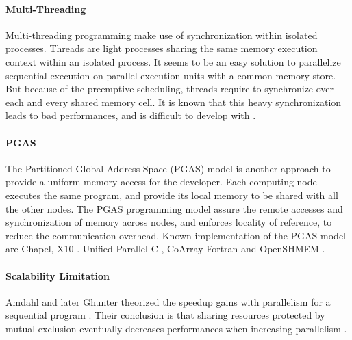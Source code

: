 
\paragraph{Multi-Threading}

Multi-threading programming make use of synchronization within isolated processes.
Threads are light processes sharing the same memory execution context within an isolated process.
It seems to be an easy solution to parallelize sequential execution on parallel execution units with a common memory store.
But because of the preemptive scheduling, threads require to synchronize over each and every shared memory cell.
It is known that this heavy synchronization leads to bad performances, and is difficult to develop with \cite{Adya2002}.


\paragraph{PGAS}

The Partitioned Global Address Space (PGAS) model is another approach to provide a uniform memory access for the developer.
Each computing node executes the same program, and provide its local memory to be shared with all the other nodes.
The PGAS programming model assure the remote accesses and synchronization of memory across nodes, and enforces locality of reference, to reduce the communication overhead.
Known implementation of the PGAS model are 
Chapel\cite{Chamberlain2007},
X10 \cite{Charles2005}.
Unified Parallel C \cite{El-Ghazawi2006},
CoArray Fortran \cite{Numrich1998} and
OpenSHMEM \cite{Chapman2010}.

\paragraph{Scalability Limitation}

Amdahl and later Ghunter theorized the speedup gains with parallelism for a sequential program \cite{Amdahl1967}.
Their conclusion is that sharing resources protected by mutual exclusion eventually decreases performances when increasing parallelism \cite{Gustafson1988,Gunther1993,Gunther1996,Nelson1996,Gunther2002}.

